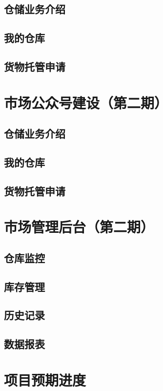 \documentclass[12pt,a4paper,openany]{ctexrep}
\begin{document}
\section{仓储业务介绍}
\section{我的仓库}							%
\section{货物托管申请}

\chapter{市场公众号建设（第二期）}
\section{仓储业务介绍}
\section{我的仓库}
\section{货物托管申请}

\chapter{市场管理后台（第二期）}
\section{仓库监控}							%
\section{库存管理}							%
\section{历史记录}							%
\section{数据报表}							%

\chapter{项目预期进度}
\end{document}

